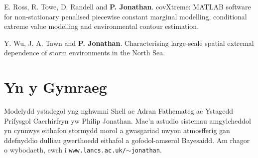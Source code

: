 \documentclass[11pt,a4paper]{moderncv}
\begin{document}
E. Ross, R. Towe, D. Randell and \textbf{P. Jonathan}. covXtreme: MATLAB software for non-stationary penalised piecewise constant marginal modelling, conditional extreme value modelling and environmental contour estimation.

Y. Wu, J. A. Tawn and \textbf{P. Jonathan}. Characterising large-scale spatial extremal dependence of storm environments in the North Sea.

\setlength{\parskip}{0em}

\section{Yn y Gymraeg}
Modelydd ystadegol yng nghwmni Shell ac Adran Fathemateg ac Ystagedd Prifysgol Caerhirfryn yw Philip Jonathan. Mae'n astudio sistemau amgylcheddol yn cynnwys eithafon stormydd morol a gwasgariad nwyon atmosfferig gan ddefnyddio dulliau gwerthoedd eithafol a gofodol-amserol Bayesaidd. Am rhagor o wybodaeth, ewch i \texttt{www.lancs.ac.uk/$\sim$jonathan}.

\clearpage
\end{document}

